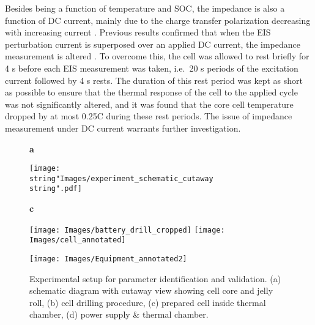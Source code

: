 \documentclass[journal, english]{IEEEtran}
\begin{document}
Besides being a function of temperature and SOC, the impedance is
also a function of DC current, mainly due to the charge transfer polarization
decreasing with increasing current \cite{Ratnakumar2006}. Previous
results confirmed that when the EIS perturbation current is superposed
over an applied DC current, the impedance measurement is altered
\cite{Richardson2014}. To overcome this, the cell was allowed to
rest briefly for 4 s before each EIS measurement was taken, i.e.\ 20 s periods
of the excitation current followed by 4 s rests. The duration of this
rest period was kept as short as possible to ensure that the thermal
response of the cell to the applied cycle was not significantly altered,
and it was found that the core cell temperature dropped by at most
0.25C during these rest periods. The issue of impedance measurement
under DC current warrants further investigation.
\begin{figure}[h]
{\Large\textbf{ a}}\par
\begin{centering}
	\texttt{[image: \\string"Images/experiment\_schematic\_cutaway\\string".pdf]}
	\par\end{centering}\vspace{0.0cm}
\begin{centering}
{ \hspace{4cm} {\Large\textbf{c}} \par\vspace{0.1cm}}
\texttt{[image: Images/battery\_drill\_cropped]} \hspace{0.2cm}\texttt{[image: Images/cell\_annotated]} { \par\vspace{0.1cm}}
\par\end{centering}
\begin{centering}
\texttt{[image: Images/Equipment\_annotated2]}
\par\end{centering}
\caption{Experimental setup for parameter identification and validation. (a) schematic diagram with cutaway view showing cell core and jelly roll, (b) cell drilling procedure, (c) prepared cell inside thermal chamber, (d) power supply \& thermal chamber.} \label{fig:Experimental-setup}
\end{figure}
\end{document}
